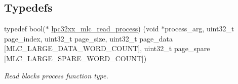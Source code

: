\subsection*{Typedefs}
\begin{DoxyCompactItemize}
\item 
typedef bool($\ast$ \mbox{\hyperlink{group__lpc32xx__nand__mlc_ga8adf1c46b26e07838b729a78d83332ee}{lpc32xx\+\_\+mlc\+\_\+read\+\_\+process}}) (void $\ast$process\+\_\+arg, uint32\+\_\+t page\+\_\+index, uint32\+\_\+t page\+\_\+size, uint32\+\_\+t page\+\_\+data \mbox{[}M\+L\+C\+\_\+\+L\+A\+R\+G\+E\+\_\+\+D\+A\+T\+A\+\_\+\+W\+O\+R\+D\+\_\+\+C\+O\+U\+NT\mbox{]}, uint32\+\_\+t page\+\_\+spare \mbox{[}M\+L\+C\+\_\+\+L\+A\+R\+G\+E\+\_\+\+S\+P\+A\+R\+E\+\_\+\+W\+O\+R\+D\+\_\+\+C\+O\+U\+NT\mbox{]})
\begin{DoxyCompactList}\small\item\em Read blocks process function type. \end{DoxyCompactList}\end{DoxyCompactItemize}
